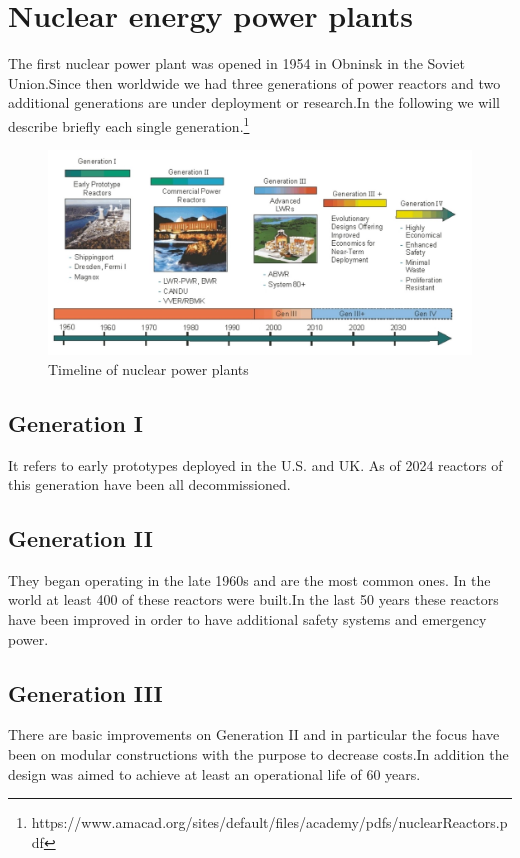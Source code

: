 \documentclass{article}
\begin{document}
\section{Nuclear energy power plants}
The first nuclear power plant was opened in 1954 in Obninsk in the Soviet Union.Since then worldwide we had three generations of power reactors and two additional generations are under deployment or research.In the following we will describe briefly each single generation.\footnote{https://www.amacad.org/sites/default/files/academy/pdfs/nuclearReactors.pdf}
\begin{figure}
    \centering
    \includegraphics[width=1\linewidth]{WhatsApp Image 2024-02-11 at 22.11.21.jpeg}
    \caption{Timeline of nuclear power plants\protect\footnotemark}
    \label{fig:enter-label}
\end{figure}

\subsection{Generation I}
It refers to early prototypes deployed in the U.S. and UK. As of 2024 reactors of this generation have been all decommissioned.

\subsection{Generation II}
They began operating in the late 1960s and are the most common ones. In the world at least 400 of these reactors were built.In the last 50 years these reactors have been improved in order to have additional safety systems and emergency power.

\subsection{Generation III}
There are basic improvements on Generation II and in particular the focus have been on modular constructions with the purpose to decrease costs.In addition the design was aimed to achieve at least an operational life of 60 years.
\end{document}
